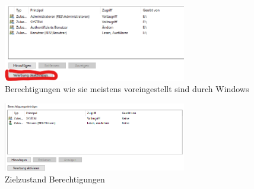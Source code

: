 \begin{figure}
    \centering
    \includegraphics[width=8cm]{data/img/berechtigungen_1.png}
    \caption{Berechtigungen wie sie meistens voreingestellt sind durch Windows}
    \label{fig:berecht_1}
\end{figure}
\begin{figure}
    \centering
    \includegraphics[width=8cm]{data/img/berechtigungen_2.png}
    \caption{Zielzustand Berechtigungen}
    \label{fig:berecht_2}
\end{figure}


